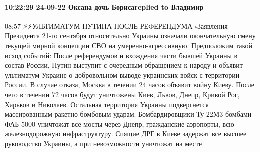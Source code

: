 \paragraph{10:22:29 24-09-22 Оксана дочь Борисаreplied to Владимир}
08:57
⚡️⚡️УЛЬТИМАТУМ ПУТИНА ПОСЛЕ РЕФЕРЕНДУМА
▫️Заявления Президента 21-го сентября относительно Украины означали окончательную смену текущей мирной концепции СВО на умеренно-агрессивную.
Предположим такой исход событий:
После референдумов и вхождения части бывшей Украины в состав России, Путин выступит с очередным обращением к народу и объявит ультиматум Украине о добровольном выводе украинских войск с территории России. В случае отказа, Москва в течении 24 часов объявит войну Киеву. После чего в течении 72 часов будут уничтожены Киев, Львов, Днепр, Кривой Рог, Харьков и Николаев. Остальная территория Украины подвергнется массированным ракетно-бомбовым ударам. Бомбардировщики Ту-22М3 бомбами ФАБ-5000 уничтожат все мосты через Днепр, гражданские аэропорты, всю железнодорожную инфраструктуру.
Спящие ДРГ в Киеве задержат все высшее руководство Украины, а при невозможности уничтожат на месте

